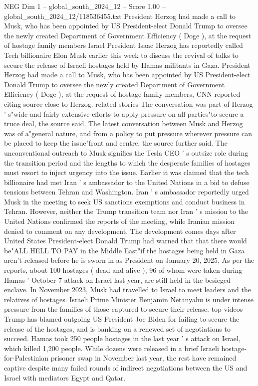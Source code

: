 \begin{textsample}{NEG Dim 1 – global\_south\_2024\_12 – Score 1.00 – global\_south\_2024\_12/118536455.txt}  \label{ex:f1_neg_339}
President Herzog had made a call to Musk, who has been appointed by US President-elect Donald Trump to oversee the newly created Department of Government Efficiency ( Doge ), at the request of hostage family members Israel President Isaac Herzog has reportedly called Tech billionaire Elon Musk earlier this week to discuss the revival of talks to secure the release of Israeli hostages held by Hamas militants in Gaza.
President Herzog had made a call to Musk, who has been appointed by US President-elect Donald Trump to oversee the newly created Department of Government Efficiency ( Doge ), at the request of hostage family members, CNN reported citing source close to Herzog. related stories The conversation was part of Herzog ' s"wide and fairly extensive efforts to apply pressure on all parties"to secure a truce deal, the source said.
The latest conversation between Musk and Herzog was of a"general nature, and from a policy to put pressure wherever pressure can be placed to keep the issue"front and centre, the source further said.
The unconventional outreach to Musk signifies the Tesla CEO ' s outsize role during the transition period and the lengths to which the desperate families of hostages must resort to inject urgency into the issue.
Earlier it was claimed that the tech billionaire had met Iran ' s ambassador to the United Nations in a bid to defuse tensions between Tehran and Washington.
Iran ' s ambassador reportedly urged Musk in the meeting to seek US sanctions exemptions and conduct business in Tehran.
However, neither the Trump transition team nor Iran ' s mission to the United Nations confirmed the reports of the meeting, while Iranian mission denied to comment on any development.
The development comes days after United States President-elect Donald Trump had warned that that there would be"ALL HELL TO PAY in the Middle East"if the hostages being held in Gaza aren't released before he is sworn in as President on January 20, 2025.
As per the reports, about 100 hostages ( dead and alive ), 96 of whom were taken during Hamas ' October 7 attack on Israel last year, are still held in the besieged enclave.
In November 2023, Musk had travelled to Israel to meet leaders and the relatives of hostages.
Israeli Prime Minister Benjamin Netanyahu is under intense pressure from the families of those captured to secure their release. top videos Trump has blamed outgoing US President Joe Biden for failing to secure the release of the hostages, and is banking on a renewed set of negotiations to succeed.
Hamas took 250 people hostages in the last year ' s attack on Israel, which killed 1,200 people.
While dozens were released in a brief Israeli hostage-for-Palestinian prisoner swap in November last year, the rest have remained captive despite many failed rounds of indirect negotiations between the US and Israel with mediators Egypt and Qatar.

\end{textsample}
